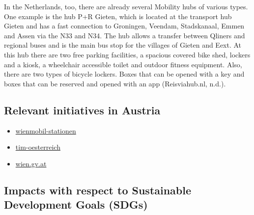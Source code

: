 \documentclass[
]{book}
\providecommand{\tightlist}{%
  \setlength{\itemsep}{0pt}\setlength{\parskip}{0pt}}
\begin{document}
In the Netherlands, too, there are already several Mobility hubs of various types. One example is the hub P+R Gieten, which is located at the transport hub Gieten and has a fast connection to Groningen, Veendam, Stadskanaal, Emmen and Assen via the N33 and N34. The hub allows a transfer between Qliners and regional buses and is the main bus stop for the villages of Gieten and Eext. At this hub there are two free parking facilities, a spacious covered bike shed, lockers and a kiosk, a wheelchair accessible toilet and outdoor fitness equipment. Also, there are two types of bicycle lockers. Boxes that can be opened with a key and boxes that can be reserved and opened with an app (Reisviahub.nl, n.d.).

\hypertarget{relevant-initiatives-in-austria-20}{%
\subsection*{Relevant initiatives in Austria}\label{relevant-initiatives-in-austria-20}}

\begin{itemize}
\tightlist
\item
  \href{https://www.wienerlinien.at/web/wiener-linien/wienmobil-stationen}{wienmobil-stationen}
\item
  \href{https://www.tim-oesterreich.at}{tim-oesterreich}
\item
  \href{https://www.wien.gv.at/stadtentwicklung/studien/pdf/b008521.pdf}{wien.gv.at}
\end{itemize}

\hypertarget{impacts-with-respect-to-sustainable-development-goals-sdgs-20}{%
\subsection*{Impacts with respect to Sustainable Development Goals (SDGs)}\label{impacts-with-respect-to-sustainable-development-goals-sdgs-20}}
\end{document}
